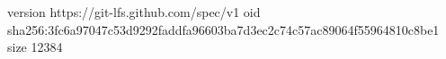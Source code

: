 version https://git-lfs.github.com/spec/v1
oid sha256:3fc6a97047c53d9292faddfa96603ba7d3ec2c74c57ac89064f55964810c8be1
size 12384
